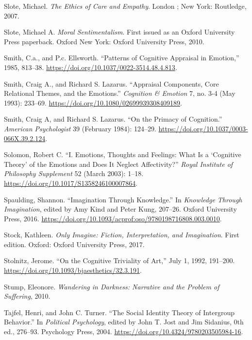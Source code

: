 \documentclass[phdthesis,12pt,final]{wuthesis}
\newlength{\cslhangindent}
\newenvironment{CSLReferences}[2] %
{\begin{list}{}{%
	\setlength{\itemindent}{0pt}
	\setlength{\leftmargin}{0pt}
	\setlength{\parsep}{0pt}
	\ifodd #1
	\setlength{\leftmargin}{\cslhangindent}
	\setlength{\itemindent}{-1\cslhangindent}
	\fi
	\setlength{\itemsep}{#2\baselineskip}}}
{\end{list}}
\theoremstyle{definition}
\theoremstyle{definition}
\theoremstyle{definition}
\theoremstyle{definition}
\theoremstyle{remark}
\begin{document}
\begin{CSLReferences}{1}{0}
Slote, Michael. \emph{The {Ethics} of {Care} and {Empathy}}. London ; New York: Routledge, 2007.

Slote, Michael A. \emph{Moral {Sentimentalism}}. First issued as an Oxford University Press paperback. Oxford New York: Oxford University Press, 2010.

Smith, C.a., and P.c. Ellsworth. {``Patterns of {Cognitive Appraisal} in {Emotion},''} 1985, 813--38. \url{https://doi.org/10.1037/0022-3514.48.4.813}.

Smith, Craig A., and Richard S. Lazarus. {``Appraisal {Components}, {Core Relational Themes}, and the {Emotions}.''} \emph{Cognition \& Emotion} 7, no. 3-4 (May 1993): 233--69. \url{https://doi.org/10.1080/02699939308409189}.

Smith, Craig A, and Richard S. Lazarus. {``On the {Primacy} of {Cognition}.''} \emph{American Psychologist} 39 (February 1984): 124--29. \url{https://doi.org/10.1037/0003-066X.39.2.124}.

Solomon, Robert C. {``I. {Emotions}, {Thoughts} and {Feelings}: {What} Is a {`{Cognitive Theory}'} of the {Emotions} and {Does} It {Neglect Affectivity}?''} \emph{Royal Institute of Philosophy Supplement} 52 (March 2003): 1--18. \url{https://doi.org/10.1017/S1358246100007864}.

Spaulding, Shannon. {``Imagination {Through Knowledge}.''} In \emph{Knowledge {Through Imagination}}, edited by Amy Kind and Peter Kung, 207--26. Oxford University Press, 2016. \url{https://doi.org/10.1093/acprof:oso/9780198716808.003.0010}.

Stock, Kathleen. \emph{Only Imagine: Fiction, Interpretation, and Imagination}. First edition. Oxford: Oxford University Press, 2017.

Stolnitz, Jerome. {``On the {Cognitive Triviality} of {Art},''} July 1, 1992, 191--200. \url{https://doi.org/10.1093/bjaesthetics/32.3.191}.

Stump, Eleonore. \emph{Wandering in {Darkness}: {Narrative} and the {Problem} of {Suffering}}, 2010.

Tajfel, Henri, and John C. Turner. {``The {Social Identity Theory} of {Intergroup Behavior}.''} In \emph{Political {Psychology}}, edited by John T. Jost and Jim Sidanius, 0th ed., 276--93. Psychology Press, 2004. \url{https://doi.org/10.4324/9780203505984-16}.


\end{CSLReferences}
\end{document}
